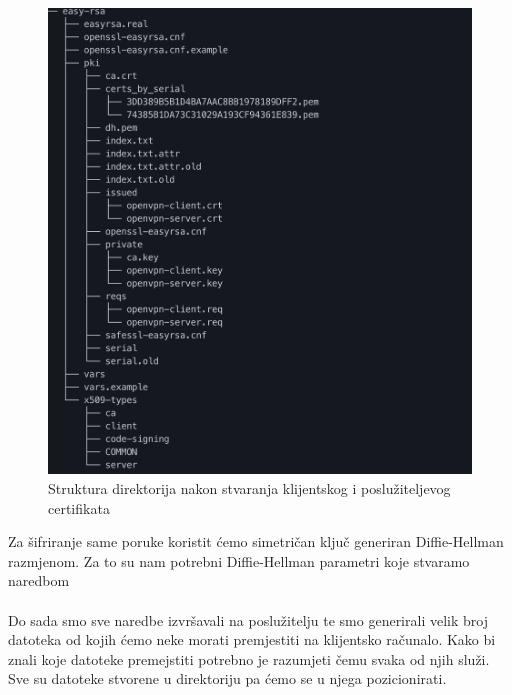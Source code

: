         \begin{figure}[H]
            \centering
            \includegraphics[scale=0.5]{slike/afterClientAndServerCert}
            \caption{Struktura direktorija nakon stvaranja klijentskog i
            poslužiteljevog certifikata}
        \end{figure}

        \noindent
        Za šifriranje same poruke koristit ćemo simetričan ključ generiran
        Diffie-Hellman razmjenom. Za to su nam potrebni Diffie-Hellman
        parametri koje stvaramo naredbom \\

        \noindent
         \\


        \noindent
        Do sada smo sve naredbe izvršavali na poslužitelju te smo generirali
        velik broj datoteka od kojih ćemo neke morati premjestiti na klijentsko
        računalo. Kako bi znali koje datoteke premejstiti potrebno je razumjeti
        čemu svaka od njih služi. Sve su datoteke stvorene u
        direktoriju pa ćemo se u njega pozicionirati. \\

